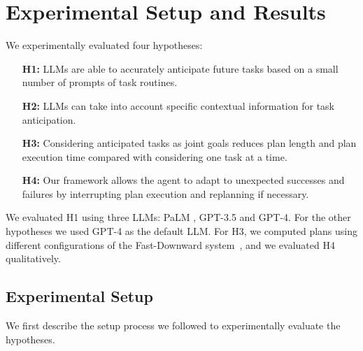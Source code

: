 \section{Experimental Setup and Results}
We experimentally evaluated four hypotheses:
\vspace{-0.75em}
\begin{enumerate}
\itemsep-10pt
\item[\textbf{H1:}] LLMs are able to accurately anticipate future tasks based on a small number of prompts of task routines.
\item[\textbf{H2:}] LLMs can take into account specific contextual information for task anticipation.
\item[\textbf{H3:}] Considering anticipated tasks as joint goals reduces plan length and plan execution time compared with considering one task at a time.
\item[\textbf{H4:}] Our framework allows the agent to adapt to unexpected successes and failures by interrupting plan execution and replanning if necessary.%
\end{enumerate}
We evaluated H1 using three LLMs: PaLM \cite{chowdhery2022palm}, GPT-3.5\cite{brown2020language} and GPT-4\cite{OpenAI2023GPT4TR}. For the other hypotheses we used GPT-4 as the default LLM. For H3, we computed plans using different configurations of the Fast-Downward system~\cite{Helmert_2006}, and we evaluated H4 qualitatively.

\subsection{Experimental Setup}
\label{sec:expt}
We first describe the setup process we followed to experimentally evaluate the hypotheses.

